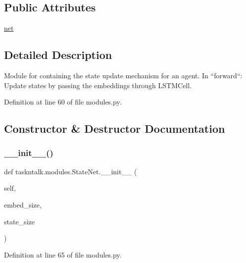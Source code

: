 \subsection*{Public Attributes}
\begin{DoxyCompactItemize}
\item 
\hyperlink{classtaskntalk_1_1modules_1_1StateNet_a778b5aa25d2564cdd5dafc5e3e4a3999}{net}
\end{DoxyCompactItemize}


\subsection{Detailed Description}
\begin{DoxyVerb}Module for containing the state update mechanism for an agent. In
``forward``: Update states by passing the embeddings through LSTMCell.
\end{DoxyVerb}
 

Definition at line 60 of file modules.\+py.



\subsection{Constructor \& Destructor Documentation}
\mbox{\label{classtaskntalk_1_1modules_1_1StateNet_a632af0c7095036fbf34848bb8f930f3a}} 
\subsubsection{\texorpdfstring{\+\_\+\+\_\+init\+\_\+\+\_\+()}{\_\_init\_\_()}}
{\footnotesize\ttfamily def taskntalk.\+modules.\+State\+Net.\+\_\+\+\_\+init\+\_\+\+\_\+ (\begin{DoxyParamCaption}\item[{}]{self,  }\item[{}]{embed\+\_\+size,  }\item[{}]{state\+\_\+size }\end{DoxyParamCaption})}



Definition at line 65 of file modules.\+py.



